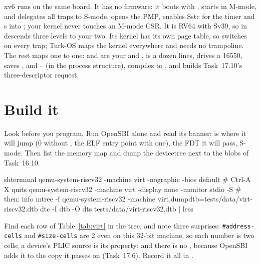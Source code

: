 \documentclass[11pt,a4paper]{article}
\begin{document}
\begin{minixbox}
xv6 runs on the same board. It has no firmware: it boots with ,  starts in
M-mode, and  delegates all traps to S-mode, opens the PMP, enables Sstc for the timer and s
into ; your kernel never touches an M-mode CSR. It is RV64 with Sv39, so  in 
descends three levels to your two. Its kernel has its own page table, so  switches  on
every trap; Turk-OS maps the kernel everywhere and needs no trampoline. The rest maps one to one: 
and  are your  and ,  is a dozen lines,  drives a
16550,  saves ,  and -- (in the process structure),
 compiles to , and  builds Task~17.10's three-descriptor request.
\end{minixbox}

\section{Build it}

Look before you program. Run OpenSBI alone and read its banner:  is where it will jump (0
without , the ELF entry point with one),  the FDT it will pass,  S-mode.
Then list the memory map and dump the devicetree next to the blobs of Task~16.10.

\begin{lst}{sh}{terminal}
qemu-system-riscv32 -machine virt -nographic -bios default       # Ctrl-A X quits
qemu-system-riscv32 -machine virt -display none -monitor stdio -S # then: info mtree -f
qemu-system-riscv32 -machine virt,dumpdtb=tests/data/virt-riscv32.dtb
dtc -I dtb -O dts tests/data/virt-riscv32.dtb | less
\end{lst}

Find each row of Table~\ref{tab:virt} in the tree, and note three surprises: \texttt{\#address-cells} and
\texttt{\#size-cells} are 2 even on this 32-bit machine, so each  number is two cells; a device's PLIC source
is its  property; and there is no , because OpenSBI adds it to the copy it
passes on (Task~17.6). Record it all in .
\end{document}
